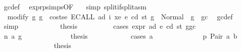 \begin{isabellebody}
\ gc{\isacharunderscore}{\kern0pt}def\ \isamarkupfalse%
\ expr{\isachardot}{\kern0pt}psimps{\isacharparenleft}{\kern0pt}{}{}{\isacharparenright}{\kern0pt}{\isacharbrackleft}{\kern0pt}OF\ {}{}{\isacharparenleft}{\kern0pt}{}{\isacharparenright}{\kern0pt}{\isacharbrackright}{\kern0pt}\ \isamarkupfalse%
\ {\isacharparenleft}{\kern0pt}simp\ split{\isacharcolon}{\kern0pt}if{\isacharunderscore}{\kern0pt}split{\isacharunderscore}{\kern0pt}asm{\isacharparenright}{\kern0pt}\isanewline
\ \ \ \ \ \ \ \ \isamarkupfalse%
\ {\isacharasterisk}{\kern0pt}{\isacharasterisk}{\kern0pt}{\isacharcolon}{\kern0pt}\ {\isachardoublequoteopen}modify\ {\isacharparenleft}{\kern0pt}{\isasymlambda}g{\isachardot}{\kern0pt}\ g\ {\isacharminus}{\kern0pt}\ costs\isactrlsub e\ {\isacharparenleft}{\kern0pt}ECALL\ ad\ i\ xe{\isacharparenright}{\kern0pt}\ e\ cd\ st{\isacharparenright}{\kern0pt}\ g\ {\isacharequal}{\kern0pt}\ Normal\ {\isacharparenleft}{\kern0pt}{\isacharparenleft}{\kern0pt}{\isacharparenright}{\kern0pt}{\isacharcomma}{\kern0pt}\ g\ {\isacharminus}{\kern0pt}\ gc{\isacharparenright}{\kern0pt}{\isachardoublequoteclose}\ \isamarkupfalse%
\ gc{\isacharunderscore}{\kern0pt}def\ \isamarkupfalse%
\ simp\isanewline
\ \ \ \ \ \ \ \ \isamarkupfalse%
\ \isamarkupfalse%
\ {\isacharquery}{\kern0pt}thesis\isanewline
\ \ \ \ \ \ \ \ \isamarkupfalse%
\ {\isacharparenleft}{\kern0pt}cases\ {\isachardoublequoteopen}expr\ ad\ e\ cd\ st\ {\isacharparenleft}{\kern0pt}g{\isacharminus}{\kern0pt}gc{\isacharparenright}{\kern0pt}{\isachardoublequoteclose}{\isacharparenright}{\kern0pt}\isanewline
\ \ \ \ \ \ \ \ \ \ \isamarkupfalse%
\ {\isacharparenleft}{\kern0pt}n\ a{}\ g{\isacharprime}{\kern0pt}{\isacharparenright}{\kern0pt}\isanewline
\ \ \ \ \ \ \ \ \ \ \isamarkupfalse%
\ \isamarkupfalse%
\ {\isacharquery}{\kern0pt}thesis\isanewline
\ \ \ \ \ \ \ \ \ \ \isamarkupfalse%
\ {\isacharparenleft}{\kern0pt}cases\ a{}{\isacharparenright}{\kern0pt}\isanewline
\ \ \ \ \ \ \ \ \ \ \ \ \isamarkupfalse%
\ p{}{\isacharcolon}{\kern0pt}\ {\isacharparenleft}{\kern0pt}Pair\ a\ b{\isacharparenright}{\kern0pt}\isanewline
\ \ \ \ \ \ \ \ \ \ \ \ \isamarkupfalse%
\ \isamarkupfalse%
\ {\isacharquery}{\kern0pt}thesis\isanewline
\ \ \ \ \ \ \ \ \ \ \ \ \isamarkupfalse%

\end{isabellebody}
